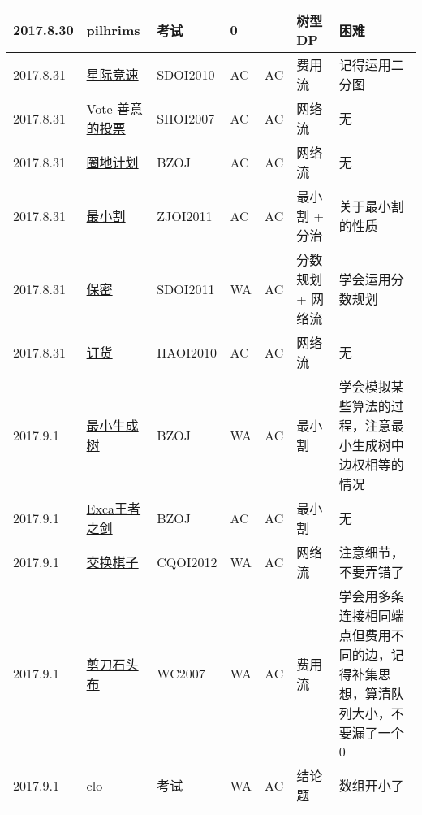 \documentclass[a4paper]{article}
\begin{document}
\begin{longtable}{|p{1.5cm}|p{2.5cm}|p{1.6cm}|p{1.6cm}|p{1cm}|p{3cm}|p{4cm}|}
		\hline
		2017.8.30 & pilhrims
		 & 考试 & 0 &  & 树型DP & 困难\\
		
		\hline
		2017.8.31 & \href {http://www.lydsy.com/JudgeOnline/problem.php?id=1927}{星际竞速}
		 & SDOI2010 & AC & AC & 费用流 & 记得运用二分图\\
		
		\hline
		2017.8.31 & \href {http://www.lydsy.com/JudgeOnline/problem.php?id=1934}{Vote 善意的投票 }
		 & SHOI2007 & AC & AC & 网络流 & 无\\
		
		\hline
		2017.8.31 & \href {http://www.lydsy.com/JudgeOnline/problem.php?id=2132}{圈地计划}
		 & BZOJ & AC & AC & 网络流 & 无\\
		
		\hline
		2017.8.31 & \href {http://www.lydsy.com/JudgeOnline/problem.php?id=2229}{最小割}
		 & ZJOI2011 & AC & AC & 最小割 + 分治 & 关于最小割的性质\\
		
		\hline
		2017.8.31 & \href {http://www.lydsy.com/JudgeOnline/problem.php?id=2285}{保密}
		 & SDOI2011 & WA & AC & 分数规划 + 网络流 & 学会运用分数规划\\
		
		\hline
		2017.8.31 & \href {http://www.lydsy.com/JudgeOnline/problem.php?id=2424}{订货}
		 & HAOI2010 & AC & AC & 网络流 & 无\\
		
		\hline
		2017.9.1 & \href {http://www.lydsy.com/JudgeOnline/problem.php?id=2561}{最小生成树}
		 & BZOJ & WA & AC & 最小割 & 学会模拟某些算法的过程，注意最小生成树中边权相等的情况\\
		
		\hline
		2017.9.1 & \href {http://www.lydsy.com/JudgeOnline/problem.php?id=1324}{Exca王者之剑}
		 & BZOJ & AC & AC & 最小割 & 无\\
		
		\hline
		2017.9.1 & \href {http://www.lydsy.com/JudgeOnline/problem.php?id=2668}{交换棋子}
		 & CQOI2012 & WA & AC & 网络流 & 注意细节，不要弄错了\\
		
		\hline
		2017.9.1 & \href {http://www.lydsy.com/JudgeOnline/problem.php?id=2597}{剪刀石头布}
		 & WC2007 & WA & AC & 费用流 & 学会用多条连接相同端点但费用不同的边，记得补集思想，算清队列大小，不要漏了一个0\\
		
		\hline
		2017.9.1 & clo
		 & 考试 & WA & AC & 结论题 & 数组开小了\\
		

\end{longtable}
\end{document}
